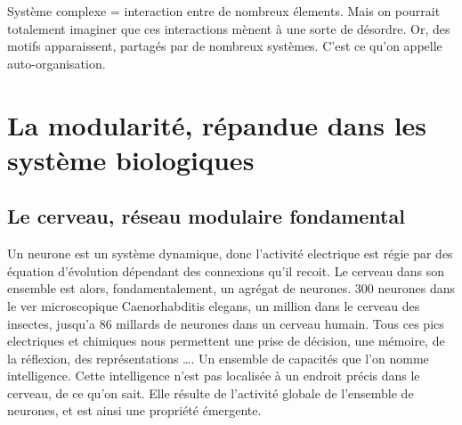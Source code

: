 Système complexe = interaction entre de nombreux élements. Mais on pourrait totalement imaginer que ces interactions mènent à une sorte de désordre. Or, des motifs apparaissent, partagés par de nombreux systèmes. C'est ce qu'on appelle auto-organisation. 








\section{La modularité, répandue dans les système biologiques}

\subsection{Le cerveau, réseau modulaire fondamental}

Un neurone est un système dynamique, donc l’activité electrique est régie par des équation d’évolution dépendant des connexions qu’il recoit. Le cerveau dans son ensemble est alors,  fondamentalement, un agrégat de neurones. 300 neurones dans le ver microscopique  Caenorhabditis elegans, un million dans le cerveau des insectes, jusqu’a 86 millards de neurones dans un cerveau humain. Tous ces pics electriques et chimiques nous permettent une prise de décision, une mémoire, de la réflexion, des représentations …. Un ensemble de capacités que l’on nomme intelligence. Cette intelligence n’est pas localisée à un endroit précis dans le cerveau, de ce qu’on sait. Elle résulte de l’activité globale de l’ensemble de neurones, et est ainsi une propriété émergente. 


